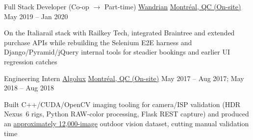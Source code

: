 \begin{cventries}
\cventry
{Full Stack Developer (Co-op $\rightarrow$ Part-time)} %
{\href{https://www.wandrian.com/}{Wandrian}} %
{\href{https://www.google.com/maps/search/?api=1\&query=Montreal,+QC,+Canada}{Montréal, QC (On-site)}} %
{May 2019 -- Jan 2020} %
{
\begin{cvitems}
\item {On the Italiarail stack with Railkey Tech, integrated Braintree and extended purchase APIs while rebuilding the Selenium E2E harness and Django/Pyramid/jQuery internal tools for steadier bookings and earlier UI regression catches}
\end{cvitems}
}

\cventry
{Engineering Intern} %
{\href{https://torc.ai/}{Algolux}} %
{\href{https://www.google.com/maps/search/?api=1\&query=Montreal,+QC,+Canada}{Montréal, QC (On-site)}} %
{May 2017 -- Aug 2017; May 2018 -- Aug 2018} %
{
\begin{cvitems}
\item {Built C++/CUDA/OpenCV imaging tooling for camera/ISP validation (HDR Nexus~6 rigs, Python RAW-color processing, Flask REST capture) and produced an \uline{approximately 12{,}000-image} outdoor vision dataset, cutting manual validation time}
\end{cvitems}
}

\end{cventries}
